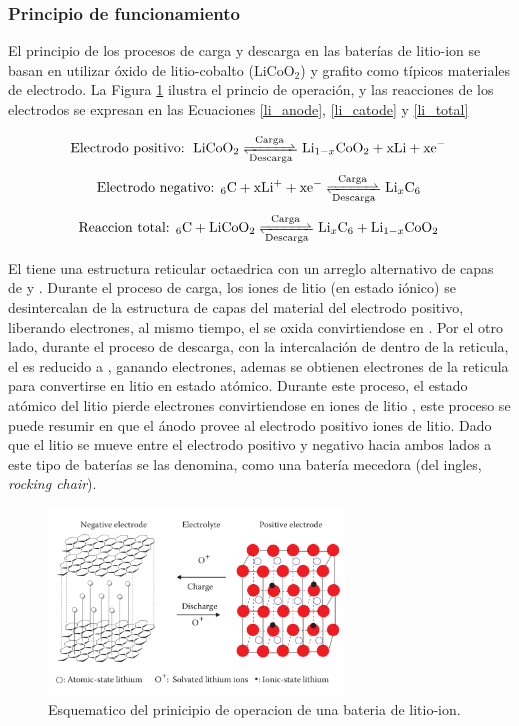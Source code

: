\documentclass[10pt,a4paper]{article}
\newcommand\reaction[1]{\begin{equation}\ce{#1}\end{equation}}
\begin{document}
    \subsubsection{Principio de funcionamiento}

    El principio de los procesos de carga y descarga en las baterías de
    litio-ion se basan en utilizar óxido de litio-cobalto ($\mathrm{LiCoO_2}$)
    y grafito como típicos materiales de electrodo. La Figura
    \ref{op_lithium-ion} ilustra el princio de operación, y las reacciones de
    los electrodos se expresan en  las Ecuaciones \ref{li_anode}, 
    \ref{li_catode} y \ref{li_total}

    \reaction{\text{Electrodo positivo: } LiCoO2 <=>[Carga][Descarga] Li_{1-x}CoO2 + xLi + xe^- \label{li_anode}}
    \reaction{\text{Electrodo negativo: }6C + xLi^+ + xe^- <=>[Carga][Descarga] Li_{x}C6 \label{li_catode}}
    \reaction{\text{Reaccion total: }6C + LiCoO2 <=>[Carga][Descarga] Li_{x}C6 + Li_{1-x}CoO2 \label{li_total}}

    \noindent El  tiene una estructura reticular octaedrica con un arreglo
    alternativo de capas de  y . Durante el proceso de
    carga, los iones de litio (en estado iónico) se desintercalan de la
    estructura de capas del material del electrodo positivo, liberando electrones, 
    al mismo tiempo, el  se oxida convirtiendose en .
    Por el otro lado, durante el proceso de descarga, con la intercalación de  dentro de 
    la reticula, el  es reducido a , ganando 
    electrones, ademas se obtienen electrones de la reticula para 
    convertirse en litio en estado atómico. Durante este proceso, el estado 
    atómico del litio pierde electrones convirtiendose en iones de litio 
    , este proceso se puede resumir en que el ánodo provee al electrodo positivo 
    iones de litio. Dado que el litio se mueve entre el electrodo positivo y 
    negativo hacia ambos lados a este tipo de baterías se las denomina, como 
    una batería mecedora (del ingles, \emph{rocking chair}).

    \begin{figure}[h!]
        \begin{center}
            \includegraphics[width=0.7\textwidth]{prin_litio}
            \caption{Esquematico del prinicipio de operacion de una bateria de
            litio-ion.}
            \label{op_lithium-ion}
        \end{center}
    \end{figure}
\end{document}
